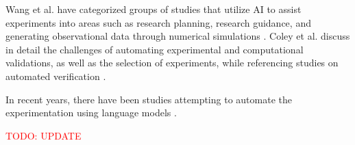 Wang et al. have categorized groups of studies that utilize AI to assist experiments into areas such as research planning, research guidance, and generating observational data through numerical simulations \cite{wang2023scientific}. Coley et al. discuss in detail the challenges of automating experimental and computational validations, as well as the selection of experiments, while referencing studies on automated verification \cite{coley2020autonomousII}.




In recent years, there have been studies attempting to automate the experimentation using language models \cite{boiko2023emergent,charness2023generation}.

\textcolor{red}{TODO: UPDATE}





